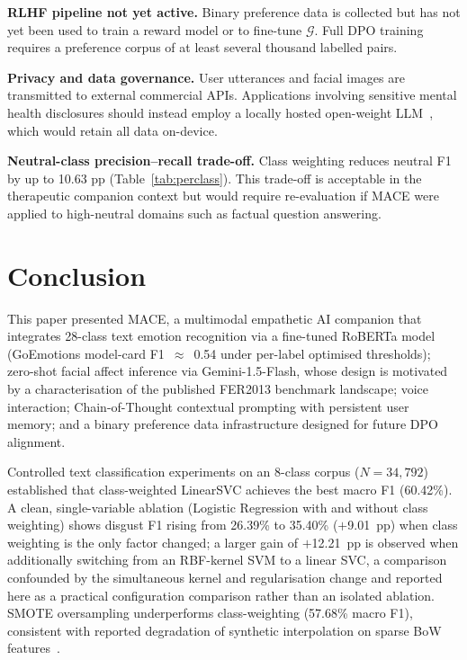 \documentclass[conference]{IEEEtran}
\begin{document}
\textbf{RLHF pipeline not yet active.}
Binary preference data is collected but has not yet been
used to train a reward model or to fine-tune $\mathcal{G}$.
Full DPO training~\cite{rafailov2023dpo} requires a preference
corpus of at least several thousand labelled pairs.

\textbf{Privacy and data governance.}
User utterances and facial images are transmitted to external
commercial APIs.
Applications involving sensitive mental health disclosures
should instead employ a locally hosted open-weight
LLM~\cite{ouyang2022rlhf}, which would retain all data
on-device.

\textbf{Neutral-class precision--recall trade-off.}
Class weighting reduces neutral F1 by up to 10.63 pp
(Table~\ref{tab:perclass}).
This trade-off is acceptable in the therapeutic companion
context but would require re-evaluation if MACE were applied
to high-neutral domains such as factual question answering.

\section{Conclusion}
\label{sec:conclusion}

This paper presented MACE, a multimodal empathetic AI companion
that integrates 28-class text emotion recognition via a
fine-tuned RoBERTa model (GoEmotions model-card F1~$\approx$~0.54
under per-label optimised thresholds); zero-shot facial affect
inference via Gemini-1.5-Flash, whose design is motivated by a
characterisation of the published FER2013 benchmark landscape;
voice interaction; Chain-of-Thought contextual prompting with
persistent user memory; and a binary preference data
infrastructure designed for future DPO alignment.

Controlled text classification experiments on an 8-class corpus
($N{=}34{,}792$) established that class-weighted LinearSVC
achieves the best macro F1 (60.42\%).
A clean, single-variable ablation (Logistic Regression with and
without class weighting) shows disgust F1 rising from 26.39\% to
35.40\% ($+$9.01~pp) when class weighting is the only factor
changed; a larger gain of $+$12.21~pp is observed when
additionally switching from an RBF-kernel SVM to a linear SVC,
a comparison confounded by the simultaneous kernel and
regularisation change and reported here as a practical
configuration comparison rather than an isolated ablation.
SMOTE oversampling underperforms class-weighting (57.68\%
macro F1), consistent with reported degradation of synthetic
interpolation on sparse BoW features~\cite{blagus2013smote}.
\end{document}
